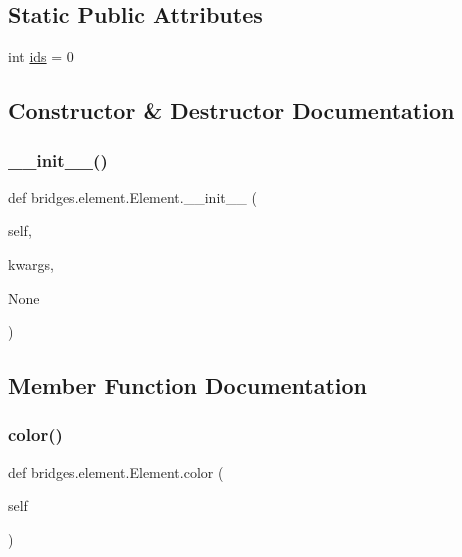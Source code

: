 \subsection*{Static Public Attributes}
\begin{DoxyCompactItemize}
\item 
int \hyperlink{classbridges_1_1element_1_1_element_a61f02c915a65554b76dd6534e5a4d834}{ids} = 0
\end{DoxyCompactItemize}


\subsection{Constructor \& Destructor Documentation}
\mbox{\label{classbridges_1_1element_1_1_element_ac0291307e216e5f2da60a340a1e2142d}} 
\subsubsection{\texorpdfstring{\+\_\+\+\_\+init\+\_\+\+\_\+()}{\_\_init\_\_()}}
{\footnotesize\ttfamily def bridges.\+element.\+Element.\+\_\+\+\_\+init\+\_\+\+\_\+ (\begin{DoxyParamCaption}\item[{}]{self,  }\item[{}]{kwargs,  }\item[{}]{None }\end{DoxyParamCaption})}



\subsection{Member Function Documentation}
\mbox{\label{classbridges_1_1element_1_1_element_af8bf34079130638064db0b03ef5bb79a}} 
\subsubsection{\texorpdfstring{color()}{color()}\hspace{0.1cm}{\footnotesize\ttfamily [1/2]}}
{\footnotesize\ttfamily def bridges.\+element.\+Element.\+color (\begin{DoxyParamCaption}\item[{}]{self }\end{DoxyParamCaption})}



